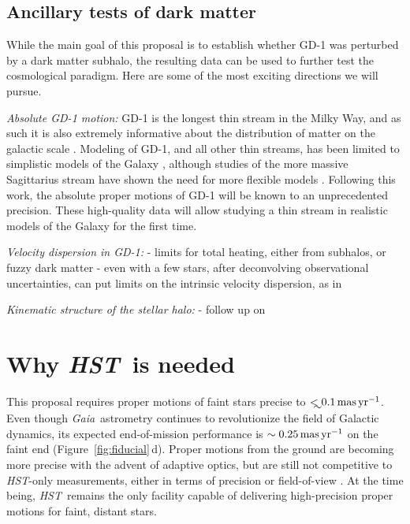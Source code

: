 \documentclass[12pt]{article}
\newcommand{\hst}{\textsl{HST}}
\newcommand{\gaia}{\textsl{Gaia}}
\begin{document}
\subsection*{Ancillary tests of dark matter}
While the main goal of this proposal is to establish whether GD-1 was perturbed by a dark matter subhalo, the resulting data can be used to further test the cosmological paradigm.
Here are some of the most exciting directions we will pursue.

\emph{Absolute GD-1 motion:}
GD-1 is the longest thin stream in the Milky Way, and as such it is also extremely informative about the distribution of matter on the galactic scale \parencite{bonaca2018}.
Modeling of GD-1, and all other thin streams, has been limited to simplistic models of the Galaxy \parencite[e.g.,][]{koposov2010}, although studies of the more massive Sagittarius stream have shown the need for more flexible models \parencite[e.g.,][]{ibata2013,fardal2018}.
Following this work, the absolute proper motions of GD-1 will be known to an unprecedented precision.
These high-quality data will allow studying a thin stream in realistic models of the Galaxy for the first time.

\emph{Velocity dispersion in GD-1:}
- limits for total heating, either from subhalos, or fuzzy dark matter
- even with a few stars, after deconvolving observational uncertainties, can put limits on the intrinsic velocity dispersion, as in \textcite{sohn2016}

\emph{Kinematic structure of the stellar halo:}
- follow up on \parencite{deason2013}

\section*{Why \hst\ is needed}
This proposal requires proper motions of faint stars precise to $\lesssim0.1\,\rm mas\, yr^{-1}$.
Even though \gaia\ astrometry continues to revolutionize the field of Galactic dynamics, its expected end-of-mission performance is $\sim0.25\,\rm mas\,yr^{-1}$ on the faint end (Figure~\ref{fig:fiducial}\,d).
Proper motions from the ground are becoming more precise with the advent of adaptive optics, but are still not competitive to \hst-only measurements, either in terms of precision or field-of-view \parencite{fritz2017}.
At the time being, \hst\ remains the only facility capable of delivering high-precision proper motions for faint, distant stars.

\end{document}
